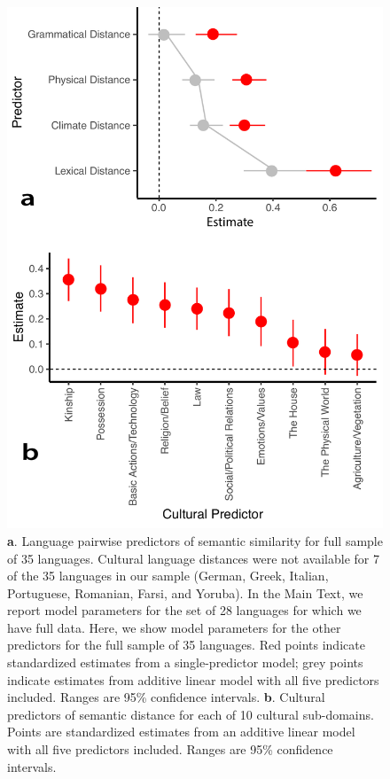 \documentclass[9pt,twoside,lineno]{pnas-new}
\begin{document}
\begin{figure}[h]
\centering
     \includegraphics[width=4.5in]{suppfigs/distance_regressions.pdf}


 \caption{{\textbf a.} Language pairwise predictors of semantic similarity for full sample of 35 languages. Cultural language distances were not available for 7 of the 35 languages in our sample (German, Greek, Italian, Portuguese, Romanian, Farsi, and Yoruba). In the Main Text, we report model parameters for the set of 28 languages for which we have full data. Here, we show model parameters for the other predictors for the full sample of 35 languages.  Red points indicate standardized estimates from a single-predictor model; grey points indicate estimates from additive linear model with all five predictors included. Ranges are 95\% confidence intervals. {\textbf b.} Cultural predictors of semantic distance for each of 10 cultural sub-domains.  Points are standardized estimates from an additive linear model with all five predictors included. Ranges are 95\% confidence intervals.}
 
 \end{figure}
\end{document}
